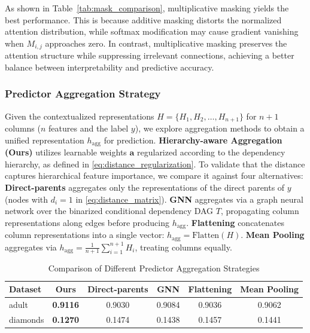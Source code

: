 \documentclass[conference]{IEEEtran}
\newcommand{\rlend}[1]{{\color{black}#1}}
\newcommand{\syadd}[1]{{\color{black}#1}}
\newcommand{\syne}[1]{{\color{black}#1}}
\newcommand{\vldb}[1]{{\color{black}#1}}
\newcommand{\syic}[1]{{\color{black}#1}}
\begin{document}
\syadd{As shown in Table~\ref{tab:mask_comparison}, multiplicative masking yields the best performance.} \rlend{This is because additive masking distorts the normalized attention distribution, while softmax modification may cause gradient vanishing when $M_{i,j}$ approaches zero. In contrast, multiplicative masking preserves the attention structure while suppressing irrelevant connections, achieving a better balance between interpretability and predictive accuracy.
}

\subsubsection{Predictor Aggregation Strategy}
\vldb{
Given the contextualized representations $H = \{H_1, H_2, \ldots, H_{n+1}\}$ for $n{+}1$ columns ($n$ features and the label $y$), we explore aggregation methods to obtain a unified representation $h_{\text{agg}}$ for prediction. \textbf{Hierarchy-aware Aggregation (Ours)} utilizes learnable weights $\mathbf{a}$ regularized according to the \syic{dependency} hierarchy, as defined in \eqref{eq:distance_regularization}. \syadd{To validate that the distance captures hierarchical feature importance, we compare it against \syic{four} alternatives:}
\syic{\textbf{Direct-parents} aggregates only the representations of the direct parents of $y$ (nodes with $d_i=1$ in \eqref{eq:distance_matrix}). \textbf{GNN} aggregates via a graph neural network over the binarized conditional dependency DAG $T$, propagating column representations along edges before producing $h_{\text{agg}}$. }
\textbf{Flattening} concatenates column representations into a single vector: $h_{\text{agg}} = \text{Flatten}(H)$. \textbf{Mean Pooling} aggregates via $h_{\text{agg}} = \frac{1}{n+1}\sum_{i=1}^{n+1} H_i$, treating columns equally.}

\begin{table}[h]
    \centering
    \caption{Comparison of Different Predictor Aggregation Strategies}
    \label{tab:predictor_comparison}
    \footnotesize
    \setlength{\tabcolsep}{1.7pt}
    \begin{tabular}{lccccc}
        \toprule
        Dataset & Ours & \syic{Direct-parents} & \syic{GNN} & Flattening & Mean Pooling \\
        \midrule
        adult   & \syne{\textbf{0.9116}} & \syic{0.9030} & \syic{0.9084} & \syne{0.9036} & \syne{0.9062} \\
        diamonds & \syic{\textbf{0.1270}} & \syic{0.1474} & \syic{0.1438} & \syne{0.1457} & \syne{0.1441} \\
        \bottomrule
    \end{tabular}
\end{table}
\end{document}
